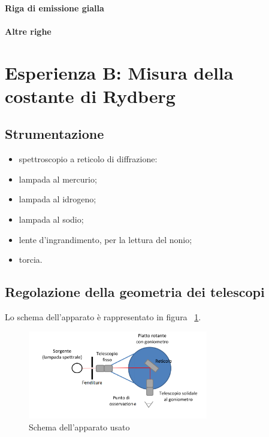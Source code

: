 \documentclass[a4paper,10pt]{article}
\begin{document}
\paragraph{Riga di emissione gialla}

\paragraph{Altre righe}

\section{Esperienza B: Misura della costante di Rydberg}

\subsection{Strumentazione}

\begin{itemize}
	\item spettroscopio a reticolo di diffrazione:

	\item lampada al mercurio;
	\item lampada al idrogeno;
	\item lampada al sodio;
	\item lente d'ingrandimento, per la lettura del nonio;
	\item torcia.
\end{itemize}


\subsection{Regolazione della geometria dei telescopi}
Lo schema dell'apparato è rappresentato in figura \figurename{~\ref{fig:schema2}}.


\begin{figure}[H]
	\centering
	\includegraphics[width=0.7\textwidth]{../grafici/Schema2.png}
	\caption{Schema dell'apparato usato}
	\label{fig:schema2}
\end{figure}
\end{document}
